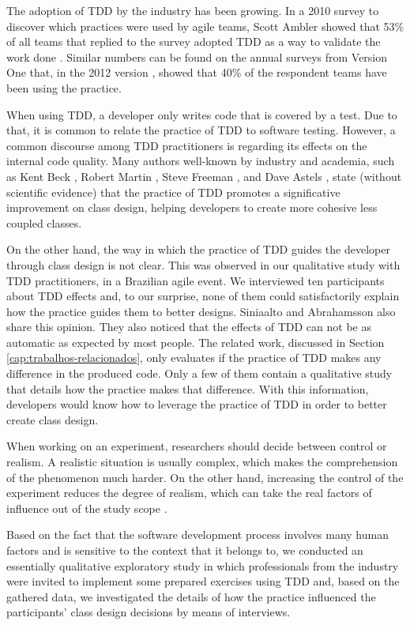 \documentclass[times]{elsarticle}
\begin{document}
The adoption of TDD by the industry has been growing. In a 2010 survey to discover
which practices were used by agile teams, Scott Ambler showed that 53\% of all teams
that replied to the survey adopted TDD as a way to validate the work done
\cite{wambler-survey-agile}. Similar numbers can be found on the annual surveys from
Version One that, in the 2012 version \cite{versionone-2012}, showed that
40\% of the respondent teams have been using the practice.

When using TDD, a developer only writes code that is covered by a test. Due
to that, it is common to relate the practice of TDD to software testing. However,
a common discourse among TDD practitioners is regarding its effects on the internal code quality.
Many authors well-known by industry and academia, such as Kent Beck \cite{TDDByExample}, 
Robert Martin \cite{agile-ppp}, Steve Freeman \cite{GOOS}, and Dave Astels \cite{astels-tdd}, 
state (without scientific evidence) that the practice of TDD promotes a significative
improvement on class design, helping developers to create more cohesive less coupled
classes.

On the other hand, the way in which the practice of TDD guides the developer
through class design is not clear. This was observed in our qualitative study
with TDD practitioners, in a Brazilian agile event. We interviewed
ten participants about TDD effects \cite{aniche-wbma} and, to our surprise,
none of them could satisfactorily explain how the practice guides them to better
designs.
Siniaalto and Abrahamsson \cite{alarming-results} also share this opinion. They also
noticed that the effects of TDD can not be as automatic as expected by most people.
The related work, discussed in Section \ref{cap:trabalhos-relacionados},
only evaluates if the practice of TDD makes any difference in the produced code. Only a few
of them contain a qualitative study that details how the practice makes that difference.
With this information, developers would know how to leverage the practice of TDD in order to 
better create class design.

When working on an experiment, researchers should decide between control
or realism. A realistic situation is usually
complex, which makes the comprehension of the phenomenon much
harder. On the other hand, increasing the control of the experiment reduces the
degree of realism, which can take the real factors of influence out of the study
scope \cite{guidelines-case-study}.

Based on the fact that the software development process involves many
human factors and is sensitive to the context that it belongs to,
we conducted an essentially qualitative exploratory study in which professionals
from the industry were invited to implement some prepared exercises using TDD and,
based on the gathered data, we investigated the details of how the practice influenced
the participants' class design decisions by means of interviews.
\end{document}
